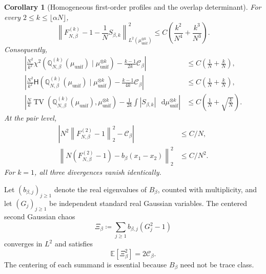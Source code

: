 \documentclass[11pt,reqno]{amsart}
\numberwithin{equation}{section}
\theoremstyle{plain}
\newtheorem{cor}[cor]{Corollary}
\theoremstyle{definition}
\newcommand{\dd}{\mathop{}\!\mathrm d}
\newcommand{\E}{\mathbb E}
\newcommand{\Q}{\mathbb Q}
\newcommand{\TV}{\operatorname{TV}}
\newcommand{\be}{\beta}
\newcommand{\Hr}{\mathsf H}
\newcommand{\muunif}{\mu_{\mathrm{unif}}}
\begin{document}
\begin{cor}[Homogeneous first-order profiles and the overlap determinant]
For every $2\leq k\leq\lfloor\alpha N\rfloor$,
\begin{equation}
 \left\|F_{N,\be}^{(k)}-1-\frac1N S_{\be,k}\right\|_{L^2(\muunif^{\otimes k})}^2
 \leq C\left(\frac{k^2}{N^4}+\frac{k^3}{N^3}\right).
 \label{eq:local-chaos-profile}
\end{equation}
Consequently,
\begin{align}
 \left|\frac{N^2}{k^2}
 \chi^2\!\left(\Q_{N,\be}^{(k)}(\muunif)\mid\muunif^{\otimes k}\right)
 -\frac{k-1}{2k}\mathcal C_{\be}\right|
 &\leq C\left(\frac1N+\frac{k}{N}\right),
 \label{eq:local-chaos-chi-rate}\\
 \left|\frac{N^2}{k^2}
 \Hr\!\left(\Q_{N,\be}^{(k)}(\muunif)\mid\muunif^{\otimes k}\right)
 -\frac{k-1}{4k}\mathcal C_{\be}\right|
 &\leq C\left(\frac1N+\frac{k}{N}\right),
 \label{eq:local-chaos-entropy-rate}\\
 \left|\frac Nk
 \TV\!\left(\Q_{N,\be}^{(k)}(\muunif),\muunif^{\otimes k}\right)
 -\frac1{2k}\int|S_{\be,k}|\,\dd\muunif^{\otimes k}\right|
 &\leq C\left(\frac1N+\sqrt{\frac{k}{N}}\right).
 \label{eq:local-chaos-TV-rate}
\end{align}
At the pair level,
\begin{align}
 \left|N^2\left\|F_{N,\be}^{(2)}-1\right\|_2^2-\mathcal C_{\be}\right|
 &\leq C/N,
 \label{eq:local-chaos-pair-norm}\\
 \left\|N\left(F_{N,\be}^{(2)}-1\right)-b_{\be}(x_1-x_2)\right\|_2^2
 &\leq C/N^2.
 \label{eq:local-chaos-pair-strong}
\end{align}
For $k=1$, all three divergences vanish identically.
\end{cor}


Let $(b_{\be,j})_{j\geq1}$ denote the real eigenvalues of $B_{\be}$, counted with multiplicity, and let $(G_j)_{j\geq1}$ be independent standard real Gaussian variables.  The centered second Gaussian chaos
\begin{equation}
 \Xi_{\be}\coloneqq\sum_{j\geq1}b_{\be,j}(G_j^2-1)
 \label{eq:homogeneous-second-chaos}
\end{equation}
converges in $L^2$ and satisfies
\begin{equation}
 \E[\Xi_{\be}^2]=2\mathcal C_{\be}.
 \label{eq:homogeneous-second-chaos-variance}
\end{equation}
The centering of each summand is essential because $B_{\be}$ need not be trace class.
\end{document}
